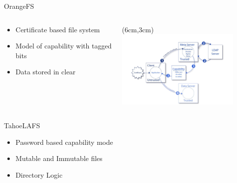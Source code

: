 \documentclass[11pt]{beamer}
\begin{document}
\begin{frame}{OrangeFS}
  \begin{columns}
    
  \begin{column}{.4\textwidth}
    \begin{itemize}
    \vfill
    \item Certificate based file system
    \vfill
    \item Model of capability with 
          tagged bits
    \vfill
    \item Data stored in clear
    \vfill
    \end{itemize}
  \end{column}
  
  \begin{column}{.6\textwidth}
    \begin{textblock*}{3cm}(6cm,3cm)
        \includegraphics[width=6cm]{img/orange.png}
    \end{textblock*}
  \end{column}
  
  \end{columns}
\end{frame}

\begin{frame}{TahoeLAFS}
    \begin{itemize}
    \vfill
    \item Password based capability mode
    \vfill
    \item Mutable and Immutable files
    \vfill
    \item Directory Logic
    \vfill
    \end{itemize}
\end{frame}
\end{document}
